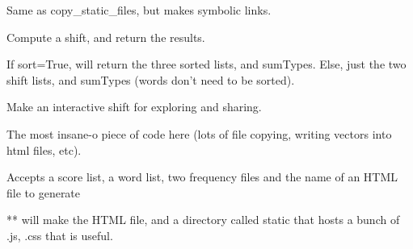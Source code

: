 
\begin{fulllineitems}
\label{labMTsimple:labMTsimple.storyLab.link_static_files}
Same as copy\_static\_files, but makes symbolic links.

\end{fulllineitems}


\begin{fulllineitems}
\label{labMTsimple:labMTsimple.storyLab.shift}
Compute a shift, and return the results.

If sort=True, will return the three sorted lists, and sumTypes. Else, just the two shift lists, and sumTypes (words don't need to be sorted).

\end{fulllineitems}


\begin{fulllineitems}
\label{labMTsimple:labMTsimple.storyLab.shiftHtml}
Make an interactive shift for exploring and sharing.

The most insane-o piece of code here (lots of file copying,
writing vectors into html files, etc).

Accepts a score list, a word list, two frequency files 
and the name of an HTML file to generate

** will make the HTML file, and a directory called static
that hosts a bunch of .js, .css that is useful.

\end{fulllineitems}


